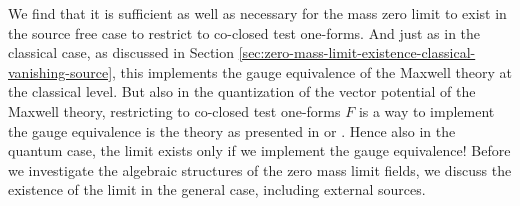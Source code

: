 %
%
We find that it is sufficient as well as necessary for the mass zero limit to exist in the source free case to restrict to co-closed test one-forms. And just as in the classical case, as discussed in Section \ref{sec:zero-mass-limit-existence-classical-vanishing-source}, this implements the gauge equivalence of the Maxwell theory at the classical level. But also in the quantization of the vector potential of the Maxwell theory, restricting to co-closed test one-forms $F$ is a way to implement the gauge equivalence is the theory as presented in \cite{Sanders} or \cite{fewster_pfenning_quantum_weak}. Hence also in the quantum case, the limit exists only if we implement the gauge equivalence! Before we investigate the algebraic structures of the zero mass limit fields, we discuss the existence of the limit in the general case, including external sources.
%
%
%
%
%
%
%
%
%
%
%
%
%
%
%
%
%
%
%
%
%
%
%
%
%
%
